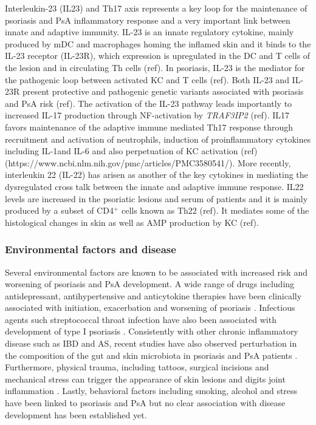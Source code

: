 Interleukin-23 (IL23) and Th17 axis represents a key loop for the maintenance of psoriasis and PsA inflammatory response and a very important link between innate and adaptive immunity. IL-23 is an innate regulatory cytokine, mainly produced by mDC and macrophages homing the inflamed skin and it binds to the IL-23 receptor (IL-23R), which expression is upregulated in the DC and T cells of the lesion and in circulating Th cells (ref). In psoriasis, IL-23 is the mediator for the pathogenic loop between activated KC and T cells (ref). Both IL-23 and IL-23R present protective and pathogenic genetic variants associated with psoriasis and PsA risk (ref). The activation of the IL-23 pathway leads importantly to increased IL-17 production through NF-\kappaB activation by \textit{TRAF3IP2} (ref). IL17 favors maintenance of the adaptive immune mediated Th17 response through recruitment and activation of neutrophils, induction of proinflammatory cytokines including IL-1\beta and IL-6 and also perpetuation of KC activation (ref) (https://www.ncbi.nlm.nih.gov/pmc/articles/PMC3580541/). %
More recently, interleukin 22 (IL-22) has arisen as another of the key cytokines in mediating the dysregulated cross talk between the innate and adaptive immune response. IL22 levels are increased in the psoriatic lesions and serum of patients and it is mainly produced by a subset of CD4$^+$ cells known as Th22 (ref). It mediates some of the histological changes in skin as well as AMP production by KC (ref).


\subsubsection*{Environmental factors and disease}
Several environmental factors are known to be associated with increased risk and worsening of psoriasis and PsA development. A wide range of drugs including antidepressant, antihypertensive and anticytokine therapies have been clinically associated with initiation, exacerbation and worsening of psoriasis \parencite{Kim2010}. Infectious agents such streptococcal throat infection have also been associated with development of type I psoriasis \parencite{Gudjonsson2003,Valdimarsson2009, Diluvio2006}. Consistently with other chronic inflammatory disease such as IBD and AS, recent studies have also observed perturbation in the composition of the gut and skin microbiota in psoriasis and PsA patients \parencite{add reference}. Furthermore, physical trauma, including tattoos, surgical incisions and mechanical stress can trigger the appearance of skin lesions and digits joint inflammation \parencite {Weiss2002,Nestle2009}. Lastly, behavioral factors including smoking, alcohol and stress have been linked to psoriasis and PsA but no clear association with disease development has been established yet\parencite{Meglio2014}.

